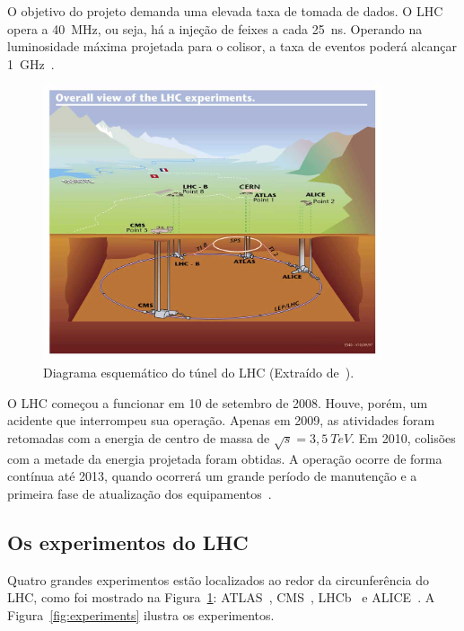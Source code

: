 O objetivo do projeto demanda uma elevada taxa de tomada de dados. O LHC opera a
40~MHz, ou seja, há a injeção de feixes a cada 25~ns. Operando na luminosidade
máxima projetada para o colisor, a taxa de eventos poderá alcançar
1~GHz~\cite{EVANS2008}.

\begin{figure}[htpb!]
    \centering
    \includegraphics[width=10cm]{images/lhc-sim.png}
    \caption[Diagrama esquemático do túnel do LHC.]{Diagrama esquemático do
    túnel do LHC (Extraído de~\cite{ref:cern_www}).}
    \label{fig:lhc}
\end{figure}

O LHC começou a funcionar em 10 de setembro de 2008. Houve, porém, um acidente
que interrompeu sua operação. Apenas em 2009, as atividades foram retomadas com
a energia de centro de massa de $\sqrt{s} = 3,5~TeV$. Em 2010, colisões com a
metade da energia projetada foram obtidas. A operação ocorre de forma contínua
até  2013, quando ocorrerá um grande período de manutenção e a primeira fase de
atualização dos equipamentos~\cite{ref:ANDERSON2011}.

\subsection{Os experimentos do LHC}

Quatro grandes experimentos estão localizados ao redor da circunferência do LHC,
como foi mostrado na Figura~\ref{fig:lhc}: ATLAS~\cite{ATLAS2008, ref:BOELAERT2012},
CMS~\cite{ref:CMS}, LHCb~\cite{ref:SZUMLAK2010} e ALICE~\cite{ref:ALICE2008}. A
Figura~\ref{fig:experiments} ilustra os experimentos.


